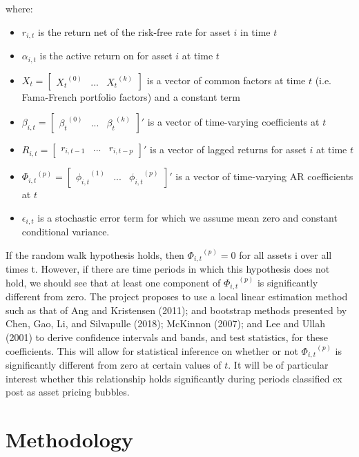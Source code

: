\documentclass{article}
\begin{document}
where:
\begin{itemize}
	\item{\(r_{i,t}\) is the return net of the risk-free rate for asset \(i\) in time \(t\)}
	\item{\(\alpha_{i,t}\) is the active return on for asset \(i\) at time \(t\)}
	\item{\(X_{t} = \begin{bmatrix}{X_{t}}^{(0)}&...&{X_{t}}^{(k)}\end{bmatrix}\) is a vector of common factors at time \(t\) (i.e. Fama-French portfolio factors) and a constant term}
	\item{\(\beta_{i,t} = \begin{bmatrix}{\beta_{t}}^{(0)}&...&{\beta_{t}}^{(k)}\end{bmatrix}'\) is a vector of time-varying coefficients at \(t\)}
	\item{\(R_{i,t} = \begin{bmatrix}r_{i,t-1}&...&r_{i,t-p}\end{bmatrix}'\) is a vector of lagged returns for asset \(i\) at time \(t\)}
	\item{\({\Phi_{i,t}}^{(p)} = \begin{bmatrix}{\phi_{i,t}}^{(1)}&...&{\phi_{i,t}}^{(p)}\end{bmatrix}'\) is a vector of time-varying AR coefficients at \(t\)}
	\item{\(\epsilon_{i,t}\) is a stochastic error term for which we assume mean zero and constant conditional variance.}
\end{itemize}

\noindent
If the random walk hypothesis holds, then \({\Phi_{i,t}}^{(p)} = 0\) for all assets i over all times t. However, if there are time periods in which this hypothesis does not hold, we should see that at least one component of  \({\Phi_{i,t}}^{(p)}\) is significantly different from zero. The project proposes to use a local linear estimation method such as that of Ang and Kristensen (2011); and bootstrap methods presented by Chen, Gao, Li, and Silvapulle (2018); McKinnon (2007); and Lee and Ullah (2001) to derive confidence intervals and bands, and test statistics, for these coefficients. This will allow for statistical inference on whether or not  \({\Phi_{i,t}}^{(p)}\)  is significantly different from zero at certain values of \(t\). It will be of particular interest whether this relationship holds significantly during periods classified ex post as asset pricing bubbles.

\section{Methodology}
\end{document}
